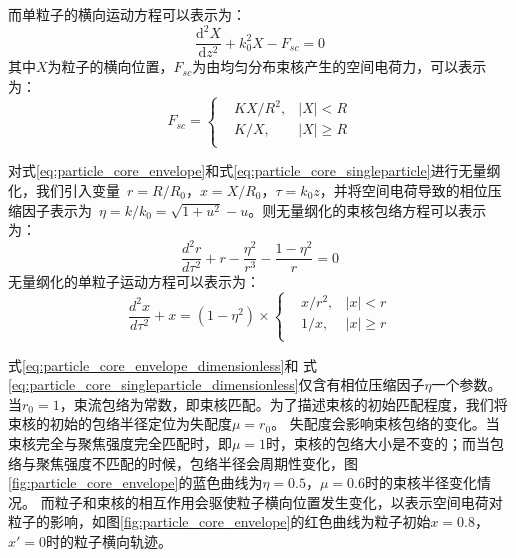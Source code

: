 而单粒子的横向运动方程可以表示为：
\begin{equation}
    \label{eq:particle_core_singleparticle}
    \frac{{{\text{d}}^{2}}X}{\text{d}{{z}^{2}}}+k_{0}^{2}X-{{F}_{sc}}=0
\end{equation}
其中$X$为粒子的横向位置，${F}_{sc}$为由均匀分布束核产生的空间电荷力，可以表示为：
\begin{equation}
{{F}_{sc}}=\left\{
        \begin{aligned}
        & KX/{{R}^{2}}, &\left| X \right|<R \\
        & K/X,          &\left| X \right|\ge R \\
        \end{aligned} \right.
\end{equation}

对式\ref{eq:particle_core_envelope}和式\ref{eq:particle_core_singleparticle}进行无量纲化，我们引入变量~$r=R/R_0$，$x=X/R_0$，$\tau = k_0 z $，并将空间电荷导致的相位压缩因子表示为~$\eta = k/k_0 = \sqrt{1+u^2}-u$。则无量纲化的束核包络方程可以表示为：
\begin{equation}
    \label{eq:particle_core_envelope_dimensionless}
    \frac{{{d}^{2}}r}{d{{\tau}^{2}}}+r-\frac{{{\eta }^{2}}}{{{r}^{3}}}-\frac{1-{\eta}^2}{r}=0
\end{equation}
无量纲化的单粒子运动方程可以表示为：
\begin{equation}
    \label{eq:particle_core_singleparticle_dimensionless}
    \frac{{{d}^{2}}x}{d{{\tau}^{2}}}+x = (1-{\eta}^2) \times \left\{
        \begin{aligned}
        & x/{{r}^{2}}, &\left| x \right|<r \\
        & 1/x,         &\left| x \right|\ge r \\
        \end{aligned} \right.
\end{equation}

式\ref{eq:particle_core_envelope_dimensionless}和
式\ref{eq:particle_core_singleparticle_dimensionless}仅含有相位压缩因子$\eta$一个参数。
当$r_0=1$，束流包络为常数，即束核匹配。为了描述束核的初始匹配程度，我们将束核的初始的包络半径定位为失配度$\mu = r_{0}$。
失配度会影响束核包络的变化。当束核完全与聚焦强度完全匹配时，即$\mu = 1$时，束核的包络大小是不变的；而当包络与聚焦强度不匹配的时候，包络半径会周期性变化，图\ref{fig:particle_core_envelope}的蓝色曲线为$\eta = 0.5$，$\mu = 0.6$时的束核半径变化情况。
而粒子和束核的相互作用会驱使粒子横向位置发生变化，以表示空间电荷对粒子的影响，如图\ref{fig:particle_core_envelope}的红色曲线为粒子初始$x=0.8$，$x'=0$时的粒子横向轨迹。

